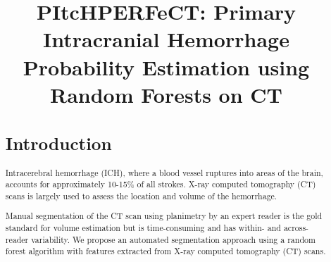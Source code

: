 \documentclass{elsarticle_nonatbib}\usepackage[]{graphicx}\usepackage[]{color}
\begin{document}
\graphicspath{{figures/}} %


\begin{frontmatter}

\date{}

\title{PItcHPERFeCT: Primary Intracranial Hemorrhage Probability Estimation using Random Forests on CT}









\address[jhsph]{Department of Biostatistics, Bloomberg School of Public Health, Johns Hopkins University, Baltimore, MD, USA}
\address[jhmi]{Department of Neurology, Division of Brain Injury Outcomes,  Johns Hopkins Medical Institutions, Baltimore, MD, USA}
\address[ucla]{Department of Neurosurgery, David Geffen School of Medicine at UCLA, Los Angeles, CA, USA}












\begin{abstract}


\section*{Introduction}

Intracerebral hemorrhage (ICH), where a blood vessel ruptures into areas of the brain, accounts for approximately 10-15\% of all strokes.  X-ray computed tomography (CT) scans is largely used to assess the location and volume of the hemorrhage.

Manual segmentation of the CT scan using planimetry by an expert reader is the gold standard for volume estimation but is time-consuming and has within- and across-reader variability.  We propose an automated segmentation approach using a random forest algorithm with features extracted from X-ray computed tomography (CT) scans.  
\vspace{-1em}

\end{abstract}
\end{frontmatter}
\end{document}
